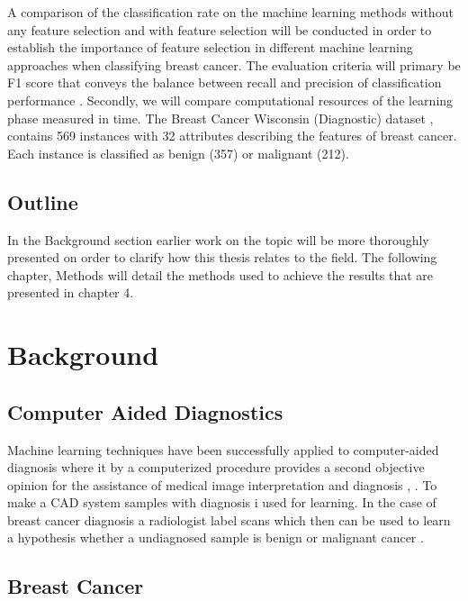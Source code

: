 \documentclass{kththesis}
\begin{document}
A comparison of the classification rate on the machine learning methods without any feature selection and with feature selection will be conducted in order to establish the importance of feature selection in different machine learning approaches when classifying breast cancer. The evaluation criteria will primary be F1 score that conveys the balance between recall and precision of classification performance \parencite{muc1992}. Secondly, we will compare computational resources of the learning phase measured in time. The Breast Cancer Wisconsin (Diagnostic) dataset \parencite{dua:2017}, contains 569 instances with 32 attributes describing the features of breast cancer. Each instance is classified as benign (357) or malignant (212).

\section{Outline} %

In the Background section earlier work on the topic will be more thoroughly presented on order to clarify how this thesis relates to the field. The following chapter, Methods will detail the methods used to achieve the results that are presented in chapter 4.

\chapter{Background}

\section{Computer Aided Diagnostics}

Machine learning techniques have been successfully applied to computer-aided diagnosis where it by a computerized procedure provides a second objective opinion for the assistance of medical image interpretation and diagnosis \parencite{li2007}, \parencite{ni2016}. To make a CAD system samples with diagnosis i used for learning. In the case of breast cancer diagnosis a radiologist label scans which then can be used to learn a hypothesis whether a undiagnosed sample is benign or malignant cancer \parencite{li2007}.

\section{Breast Cancer} %
\end{document}
